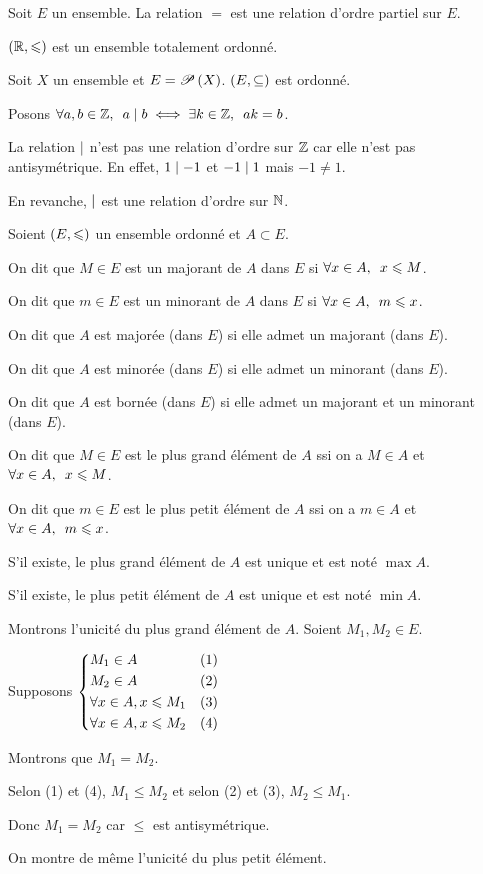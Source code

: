 \begin{ex}
Soit \(E\) un ensemble. La relation \(=\) est une relation d'ordre partiel sur \(E\).

\(\paren{\R,\leq}\) est un ensemble totalement ordonné.

Soit \(X\) un ensemble  et \(E=\P{X}\). \(\paren{E,\subset}\) est ordonné.

Posons \(\quantifs{\forall a,b\in\Z}a\divise b\iff\quantifs{\exists k\in\Z}ak=b\).

La relation \(\divise\) n'est pas une relation d'ordre sur \(\Z\) car elle n'est pas antisymétrique. En effet, \(1\divise-1\) et \(-1\divise1\) mais \(-1\not=1\).

En revanche, \(\divise\) est une relation d'ordre sur \(\N\).
\end{ex}

\begin{defi}
Soient \(\paren{E,\leq}\) un ensemble ordonné et \(A\subset E\).

On dit que \(M\in E\) est un majorant de \(A\) dans \(E\) si \(\quantifs{\forall x\in A}x\leq M\).

On dit que \(m\in E\) est un minorant de \(A\) dans \(E\) si \(\quantifs{\forall x\in A}m\leq x\).

On dit que \(A\) est majorée (dans \(E\)) si elle admet un majorant (dans \(E\)).

On dit que \(A\) est minorée (dans \(E\)) si elle admet un minorant (dans \(E\)).

On dit que \(A\) est bornée (dans \(E\)) si elle admet un majorant et un minorant (dans \(E\)).

On dit que \(M\in E\) est le plus grand élément de \(A\) ssi on a \(M\in A\) et \(\quantifs{\forall x\in A}x\leq M\).

On dit que \(m\in E\) est le plus petit élément de \(A\) ssi on a \(m\in A\) et \(\quantifs{\forall x\in A}m\leq x\).

S'il existe, le plus grand élément de \(A\) est unique et est noté \(\max A\).

S'il existe, le plus petit élément de \(A\) est unique et est noté \(\min A\).
\end{defi}

\begin{dem}
Montrons l'unicité du plus grand élément de \(A\). Soient \(M_1,M_2\in E\).

Supposons \(\begin{dcases}M_1\in A &(1) \\ M_2\in A &(2) \\ \forall x\in A,x\leq M_1 &(3) \\ \forall x\in A,x\leq M_2 &(4)\end{dcases}\)

Montrons que \(M_1=M_2\).

Selon (1) et (4), \(M_1\leq M_2\) et selon (2) et (3), \(M_2\leq M_1\).

Donc \(M_1=M_2\) car \(\leq\) est antisymétrique.

On montre de même l'unicité du plus petit élément.
\end{dem}

